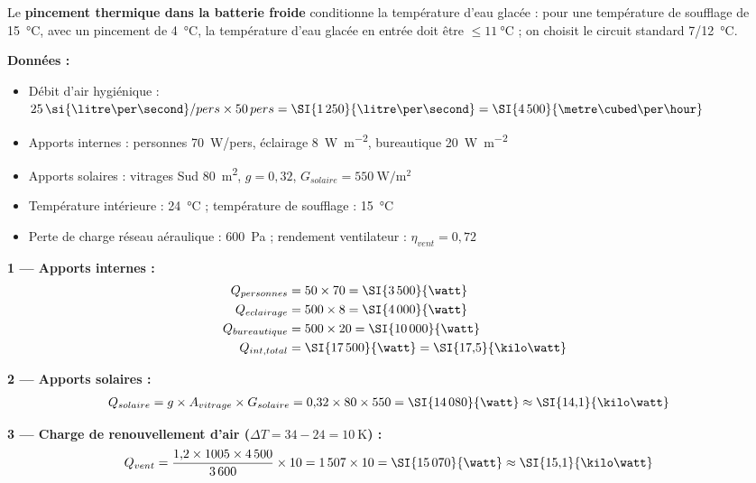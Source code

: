 Le \textbf{pincement thermique dans la batterie froide} conditionne la température d'eau glacée :
pour une température de soufflage de \SI{15}{\celsius}, avec un pincement de \SI{4}{\celsius},
la température d'eau glacée en entrée doit être $\leq \SI{11}{\celsius}$ ;
on choisit le circuit standard \SI[parse-numbers=false]{7/12}{\celsius}.

\begin{exemple}[title={Bureaux 500 m² à Bordeaux — Dimensionnement CTA}]
\textbf{Données :}
\begin{itemize}
  \item Débit d'air hygiénique : $25\,\si{\litre\per\second}/pers \times 50\,pers = \SI{1\,250}{\litre\per\second} = \SI{4\,500}{\metre\cubed\per\hour}$
  \item Apports internes : personnes \SI{70}{\watt}/pers, éclairage \SI{8}{\watt\per\metre\squared}, bureautique \SI{20}{\watt\per\metre\squared}
  \item Apports solaires : vitrages Sud \SI{80}{\metre\squared}, $g = 0{,}32$, $G_{solaire} = \SI{550}{\watt\per\metre\squared}$
  \item Température intérieure : \SI{24}{\celsius} ; température de soufflage : \SI{15}{\celsius}
  \item Perte de charge réseau aéraulique : \SI{600}{\pascal} ; rendement ventilateur : $\eta_{vent} = 0{,}72$
\end{itemize}

\textbf{1 — Apports internes :}
\begin{align*}
  Q_{personnes}  &= 50 \times 70 = \SI{3\,500}{\watt} \\
  Q_{eclairage}  &= 500 \times 8 = \SI{4\,000}{\watt} \\
  Q_{bureautique}&= 500 \times 20 = \SI{10\,000}{\watt} \\
  Q_{int,total}  &= \SI{17\,500}{\watt} = \SI{17{,}5}{\kilo\watt}
\end{align*}

\textbf{2 — Apports solaires :}
\begin{align*}
  Q_{solaire} &= g \times A_{vitrage} \times G_{solaire} = 0{,}32 \times 80 \times 550 = \SI{14\,080}{\watt} \approx \SI{14{,}1}{\kilo\watt}
\end{align*}

\textbf{3 — Charge de renouvellement d'air ($\Delta T = 34 - 24 = \SI{10}{\kelvin}$) :}
\begin{align*}
  Q_{vent} &= \frac{1{,}2 \times 1005 \times 4\,500}{3\,600} \times 10 = 1\,507 \times 10 = \SI{15\,070}{\watt} \approx \SI{15{,}1}{\kilo\watt}
\end{align*}


\end{exemple}
